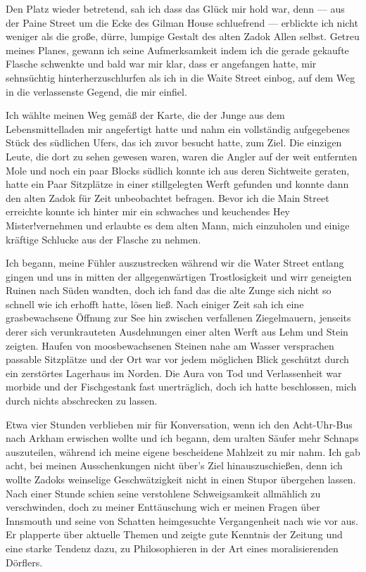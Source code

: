 Den Platz wieder betretend, sah ich dass das Glück mir hold war, denn --- aus der Paine Street um die Ecke des Gilman House schluefrend --- erblickte ich nicht weniger als die große, dürre, lumpige Gestalt des alten Zadok Allen selbst. Getreu meines Planes, gewann ich seine Aufmerksamkeit indem ich die gerade gekaufte Flasche schwenkte und bald war mir  klar, dass er angefangen hatte, mir sehnsüchtig hinterherzuschlurfen als ich in die Waite Street einbog, auf dem Weg in die verlassenste Gegend, die mir einfiel.

Ich wählte meinen Weg gemäß der Karte, die der Junge aus dem Lebensmittelladen mir angefertigt hatte und nahm ein vollständig aufgegebenes Stück des südlichen Ufers, das ich zuvor besucht hatte, zum Ziel. Die einzigen Leute, die dort zu sehen gewesen waren, waren die Angler auf der weit entfernten Mole und noch ein paar Blocks südlich konnte ich aus deren Sichtweite geraten, hatte ein Paar Sitzplätze in einer stillgelegten Werft gefunden und konnte dann den alten Zadok für Zeit unbeobachtet befragen. Bevor ich die Main Street erreichte konnte ich hinter mir ein schwaches und keuchendes \glqq Hey Mister!\grqq vernehmen und erlaubte es dem alten Mann, mich einzuholen und einige kräftige Schlucke aus der Flasche zu nehmen.

Ich begann, meine Fühler auszustrecken während wir die Water Street entlang gingen und uns in mitten der allgegenwärtigen Trostlosigkeit und wirr geneigten Ruinen nach Süden wandten, doch ich fand das die alte Zunge sich nicht so schnell wie ich erhofft hatte, lösen ließ. Nach einiger Zeit sah ich eine grasbewachsene Öffnung zur See hin zwischen verfallenen Ziegelmauern, jenseits derer sich verunkrauteten Ausdehnungen einer alten Werft aus Lehm und Stein zeigten. Haufen von moosbewachsenen Steinen nahe am Wasser versprachen passable Sitzplätze und der Ort war vor jedem möglichen Blick geschützt durch ein zerstörtes Lagerhaus im Norden. Die Aura von Tod und Verlassenheit war morbide und der Fischgestank fast unerträglich, doch ich hatte beschlossen, mich durch nichts abschrecken zu lassen.

Etwa vier Stunden verblieben mir für Konversation, wenn ich den Acht-Uhr-Bus nach Arkham erwischen wollte und ich begann, dem uralten Säufer mehr Schnaps auszuteilen, während ich meine eigene bescheidene Mahlzeit zu mir nahm. Ich gab acht, bei meinen Ausschenkungen nicht über's Ziel hinauszuschießen, denn ich wollte Zadoks weinselige Geschwätzigkeit nicht in einen Stupor übergehen lassen. Nach einer Stunde schien seine verstohlene Schweigsamkeit allmählich zu verschwinden, doch zu meiner Enttäuschung wich er meinen Fragen über Innsmouth und seine von Schatten heimgesuchte Vergangenheit nach wie vor aus. Er plapperte über aktuelle Themen und zeigte gute Kenntnis der Zeitung und eine starke Tendenz dazu, zu Philosophieren in der Art eines moralisierenden Dörflers.

